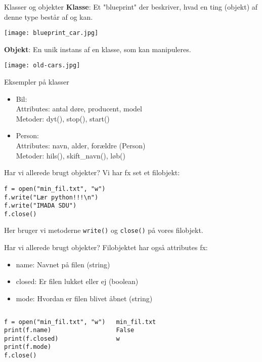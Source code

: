 \documentclass[main.tex]{subfiles}
\begin{document}
\begin{frame}{Klasser og objekter}
	\textbf{Klasse}: Et "blueprint" der beskriver, hvad en ting (objekt) af denne type består af og kan.
	\begin{center}
	\texttt{[image: blueprint\_car.jpg]}
	\end{center}
	
	\vfill
	\textbf{Objekt}: En unik instans af en klasse, som kan manipuleres.\\
	\begin{center}
	\texttt{[image: old-cars.jpg]}
	\end{center}

\end{frame}


\begin{frame}{Eksempler på klasser}
	\begin{itemize}
		\item Bil: \\
			Attributes: antal døre, producent, model\\
			Metoder: dyt(), stop(), start()
		\item Person: \\
			Attributes: navn, alder, forældre (Person)\\
			Metoder: hils(), skift\_navn(), løb()
	\end{itemize}
\end{frame}


\begin{frame}[fragile]{Har vi allerede brugt objekter?}
	\pause
	Vi har fx set et filobjekt:
	\begin{lstlisting}[style=python]
f = open("min_fil.txt", "w")
f.write("Lær python!!!\n")
f.write("IMADA SDU")
f.close()
	\end{lstlisting}
	Her bruger vi metoderne \texttt{write()} og \texttt{close()} på vores filobjekt.\\
\end{frame}


\begin{frame}[fragile]{Har vi allerede brugt objekter?}
		Filobjektet har også attributes fx:
	\begin{itemize}
		\item name: Navnet på filen (string)
		\item closed: Er filen lukket eller ej (boolean)
		\item mode: Hvordan er filen blivet åbnet (string)
	\end{itemize}
	\begin{columns}
		\begin{lstlisting}[style=python]
f = open("min_fil.txt", "w")
print(f.name)
print(f.closed)
print(f.mode)
f.close()
		\end{lstlisting}
		\begin{lstlisting}[style=python]
min_fil.txt
False
w
		\end{lstlisting}
	\end{columns}
\end{frame}
\end{document}
